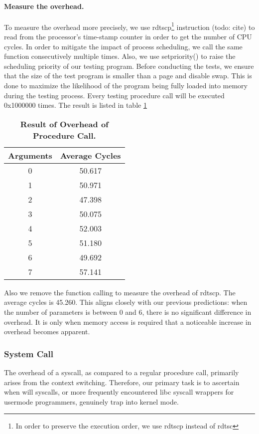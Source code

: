 \paragraph{Measure the overhead.} To measure the overhead more precisely, we use rdtscp\footnote{In order to preserve the execution order, we use rdtscp instead of rdtsc} instruction (todo: cite) to read from the processor’s time-stamp counter in order to get the number of CPU cycles. In order to mitigate the impact of process scheduling, we call the same function consecutively multiple times. Also, we use setpriority() to raise the scheduling priority of our testing program. Before conducting the tests, we ensure that the size of the test program is smaller than a page and disable swap. This is done to maximize the likelihood of the program being fully loaded into memory during the testing process. Every testing procedure call will be executed 0x1000000 times. The result is listed in table \ref{table:procedure-test}
\begin{table}[h]
	\centering
	\begin{tabular}{c|c}
		\hline
		\bf{Arguments} & \bf{Average Cycles} \\ \hline
		0 & 50.617 \\ \hline
		1 & 50.971 \\ \hline
		2 & 47.398 \\ \hline
        3 & 50.075 \\ \hline
        4 & 52.003 \\ \hline
        5 & 51.180 \\ \hline
        6 & 49.692 \\ \hline
        7 & 57.141 \\ \hline
	\end{tabular}
	\caption{\textbf{Result of Overhead of Procedure Call.}}
	\label{table:procedure-test}
\end{table}
Also we remove the function calling to measure the overhead of rdtscp.
The average cycles is 45.260. This aligns closely with our previous predictions: when the number of parameters is between 0 and 6, there is no significant difference in overhead. It is only when memory access is required that a noticeable increase in overhead becomes apparent.

\subsubsection{System Call}
The overhead of a syscall, as compared to a regular procedure call, primarily arises from the context switching. Therefore, our primary task is to ascertain when will syscalls, or more frequently encountered libc syscall wrappers for usermode programmers, genuinely trap into kernel mode.


